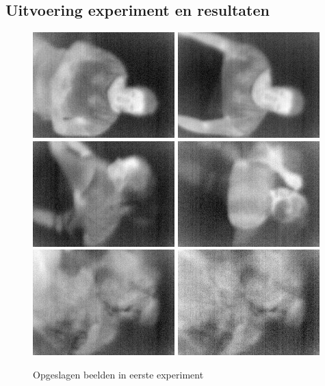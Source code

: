 \subsection{Uitvoering experiment en resultaten}
\label{ERefOBU}
\begin{figure}[hbp]
	\includegraphics[scale=0.65]{EersteExperiment_img0}
	\includegraphics[scale=0.65]{EersteExperiment_img2}
	\includegraphics[scale=0.65]{EersteExperiment_img3}
	\includegraphics[scale=0.65]{EersteExperiment_img6}
	\includegraphics[scale=0.65]{EersteExperiment_img9}
	\includegraphics[scale=0.65]{EersteExperiment_img10}
	\caption{Opgeslagen beelden in eerste experiment}
	\label{imgEEx}
\end{figure}
